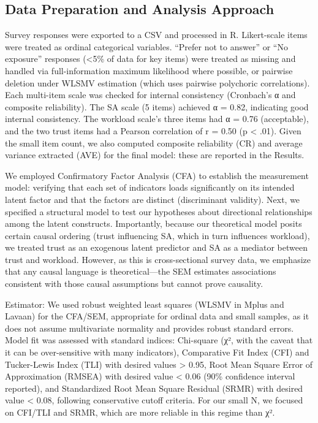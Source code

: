 \documentclass[conference]{IEEEtran}
\begin{document}
\subsection{Data Preparation and Analysis Approach}
Survey responses were exported to a CSV and processed in R. Likert-scale items were treated as ordinal categorical variables. “Prefer not to answer” or “No exposure” responses (<5\% of data for key items) were treated as missing and handled via full-information maximum likelihood where possible, or pairwise deletion under WLSMV estimation (which uses pairwise polychoric correlations). Each multi-item scale was checked for internal consistency (Cronbach’s α and composite reliability). The SA scale (5 items) achieved α = 0.82, indicating good internal consistency. The workload scale’s three items had α = 0.76 (acceptable), and the two trust items had a Pearson correlation of r = 0.50 (p < .01). Given the small item count, we also computed composite reliability (CR) and average variance extracted (AVE) for the final model: these are reported in the Results.

We employed Confirmatory Factor Analysis (CFA) to establish the measurement model: verifying that each set of indicators loads significantly on its intended latent factor and that the factors are distinct (discriminant validity). Next, we specified a structural model to test our hypotheses about directional relationships among the latent constructs. Importantly, because our theoretical model posits certain causal ordering (trust influencing SA, which in turn influences workload), we treated trust as an exogenous latent predictor and SA as a mediator between trust and workload. However, as this is cross-sectional survey data, we emphasize that any causal language is theoretical—the SEM estimates associations consistent with those causal assumptions but cannot prove causality.

Estimator: We used robust weighted least squares (WLSMV in Mplus and Lavaan) for the CFA/SEM, appropriate for ordinal data and small samples, as it does not assume multivariate normality and provides robust standard errors. Model fit was assessed with standard indices: Chi-square (χ², with the caveat that it can be over-sensitive with many indicators), Comparative Fit Index (CFI) and Tucker-Lewis Index (TLI) with desired values > 0.95, Root Mean Square Error of Approximation (RMSEA) with desired value < 0.06 (90\% confidence interval reported), and Standardized Root Mean Square Residual (SRMR) with desired value < 0.08, following conservative cutoff criteria. For our small N, we focused on CFI/TLI and SRMR, which are more reliable in this regime than χ². 
\end{document}
